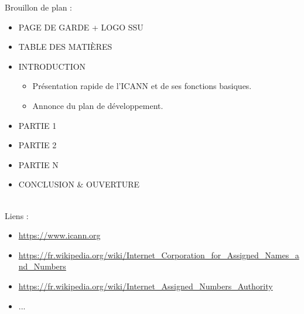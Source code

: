 \documentclass{article}
\begin{document}
Brouillon de plan :\\
\begin{itemize}
	\item PAGE DE GARDE + LOGO SSU
	\item TABLE DES MATIÈRES
	\item INTRODUCTION
	\begin{itemize}
		\item Présentation rapide de l'ICANN et de ses fonctions basiques.
		\item Annonce du plan de développement.
	\end{itemize}
	\item PARTIE 1
	\item PARTIE 2
	\item PARTIE N
	\item CONCLUSION \& OUVERTURE\\\\
\end{itemize}



Liens :\\
\begin{itemize}
	\item \url{https://www.icann.org}
	\item \url{https://fr.wikipedia.org/wiki/Internet_Corporation_for_Assigned_Names_and_Numbers}
	\item \url{https://fr.wikipedia.org/wiki/Internet_Assigned_Numbers_Authority}
	\item ...
\end{itemize}
\end{document}
